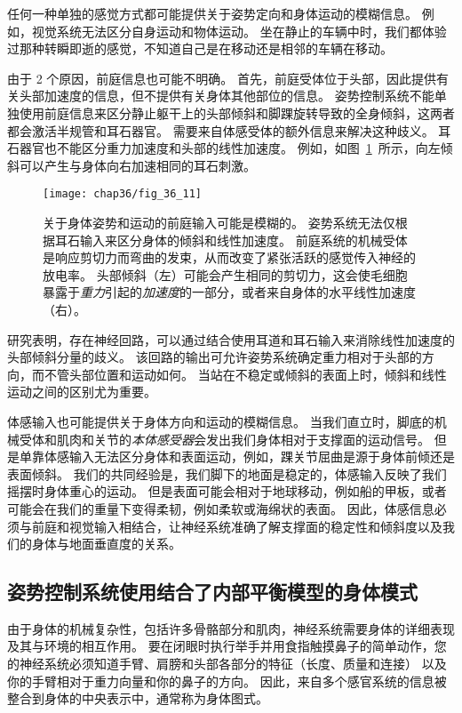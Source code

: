 任何一种单独的感觉方式都可能提供关于姿势定向和身体运动的模糊信息。
例如，视觉系统无法区分自身运动和物体运动。
坐在静止的车辆中时，我们都体验过那种转瞬即逝的感觉，不知道自己是在移动还是相邻的车辆在移动。


由于 2 个原因，前庭信息也可能不明确。
首先，前庭受体位于头部，因此提供有关头部加速度的信息，但不提供有关身体其他部位的信息。
姿势控制系统不能单独使用前庭信息来区分静止躯干上的头部倾斜和脚踝旋转导致的全身倾斜，这两者都会激活半规管和耳石器官。
需要来自体感受体的额外信息来解决这种歧义。
耳石器官也不能区分重力加速度和头部的线性加速度。 
例如，如图~\ref{fig:36_11}~所示，向左倾斜可以产生与身体向右加速相同的耳石刺激。


\begin{figure}[htbp]
	\centering
	\texttt{[image: chap36/fig\_36\_11]}
	\caption{关于身体姿势和运动的前庭输入可能是模糊的。
		姿势系统无法仅根据耳石输入来区分身体的倾斜和线性加速度。
		前庭系统的机械受体是响应剪切力而弯曲的发束，从而改变了紧张活跃的感觉传入神经的放电率。
		头部倾斜（左）可能会产生相同的剪切力，这会使毛细胞暴露于\textit{重力}引起的\textit{加速度}的一部分，或者来自身体的水平线性加速度（右）。}
	\label{fig:36_11}
\end{figure}


研究表明，存在神经回路，可以通过结合使用耳道和耳石输入来消除线性加速度的头部倾斜分量的歧义。
该回路的输出可允许姿势系统确定重力相对于头部的方向，而不管头部位置和运动如何。
当站在不稳定或倾斜的表面上时，倾斜和线性运动之间的区别尤为重要。


体感输入也可能提供关于身体方向和运动的模糊信息。
当我们直立时，脚底的机械受体和肌肉和关节的\textit{本体感受器}会发出我们身体相对于支撑面的运动信号。
但是单靠体感输入无法区分身体和表面运动，例如，踝关节屈曲是源于身体前倾还是表面倾斜。
我们的共同经验是，我们脚下的地面是稳定的，体感输入反映了我们摇摆时身体重心的运动。
但是表面可能会相对于地球移动，例如船的甲板，或者可能会在我们的重量下变得柔韧，例如柔软或海绵状的表面。
因此，体感信息必须与前庭和视觉输入相结合，让神经系统准确了解支撑面的稳定性和倾斜度以及我们的身体与地面垂直度的关系。



\subsection{姿势控制系统使用结合了内部平衡模型的身体模式}

由于身体的机械复杂性，包括许多骨骼部分和肌肉，神经系统需要身体的详细表现及其与环境的相互作用。
要在闭眼时执行举手并用食指触摸鼻子的简单动作，您的神经系统必须知道手臂、肩膀和头部各部分的特征（长度、质量和连接） 以及你的手臂相对于重力向量和你的鼻子的方向。
因此，来自多个感官系统的信息被整合到身体的中央表示中，通常称为身体图式。


